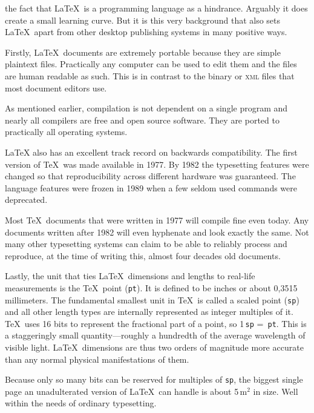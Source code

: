\documentclass[a4paper,justified]{tufte-handout}
\begin{document}
 the fact that \LaTeX\ is a programming language as a hindrance. Arguably it does create a small learning curve. But it is this very background that also sets \LaTeX\ apart from other desktop publishing systems in many positive ways.

Firstly, \LaTeX\ documents are extremely portable because they are simple plaintext files.  Practically any computer can be used to edit them and the files are human readable as such. This is in contrast to the binary or \textsc{xml} files that most document editors use.

As mentioned earlier, compilation is not dependent on a single program and nearly all compilers are free and open source software. They are ported to practically all operating systems.

\LaTeX{} also has an excellent track record on backwards compatibility. The first version of \TeX\ was made available in 1977. By 1982 the typesetting features were changed so that reproducibility across different hardware was guaranteed. The language features were frozen in 1989 when a few seldom used commands were deprecated.

Most \TeX\ documents that were written in 1977 will compile fine even today. Any documents written after 1982 will even hyphenate and look exactly the same. Not many other typesetting systems can claim to be able to reliably process and reproduce, at the time of writing this, almost four decades old documents.

Lastly, the unit that ties \LaTeX\ dimensions and lengths to real-life measurements is the \TeX\ point (\texttt{pt}). It is defined to be  inches or about 0,3515 millimeters. The fundamental smallest unit in \TeX\ is called a scaled point (\texttt{sp}) and all other length types are internally represented as integer multiples of it. \TeX\ uses 16 bits to represent the fractional part of a point, so 1\,\texttt{sp} = \,\texttt{pt}. This is a staggeringly small quantity---roughly a hundredth of the average wavelength of visible light. \LaTeX\ dimensions are thus two orders of magnitude more accurate than any normal physical manifestations of them.

Because only so many bits can be reserved for multiples of \texttt{sp}, the biggest single page an unadulterated version of \LaTeX\ can handle is about 5\,m$^{\textrm{2}}$ in size. Well within the needs of ordinary typesetting.
\end{document}
